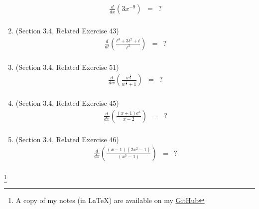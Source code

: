 \documentclass{article}
\newcommand\blfootnote[1]{
    \begingroup
    \renewcommand\thefootnote{}\footnote{#1}
    \addtocounter{footnote}{-1}
    \endgroup
}
\begin{document}
\begin{enumerate}
        \begin{eqnarray}
            \frac{d}{dx}\left(3x^{-9}\right) &=& ? \\
        \end{eqnarray}
    \item (Section 3.4, Related Exercise 43)
        \begin{eqnarray}
            \frac{d}{dt}\left(\frac{t^3 + 3t^2 + t}{t^3}\right) &=& ? \\
        \end{eqnarray}
    \item (Section 3.4, Related Exercise 51)
        \begin{eqnarray}
            \frac{d}{dw}\left(\frac{w^{\frac{5}{3}}}{w^{\frac{5}{3}} + 1}\right) &=& ? \\
        \end{eqnarray}
    \item (Section 3.4, Related Exercise 45)
        \begin{eqnarray}
            \frac{d}{dx}\left(\frac{(x + 1)e^x}{x - 2}\right) &=& ? \\
        \end{eqnarray}
    \item (Section 3.4, Related Exercise 46)
        \begin{eqnarray}
            \frac{d}{dx}\left(\frac{(x - 1)(2x^2 - 1)}{(x^3 - 1)}\right) &=& ? \\
        \end{eqnarray}
\end{enumerate}

\blfootnote{A copy of my notes (in \LaTeX) are available on my \href{https://github.com/onlinechronically/MATH-211}{GitHub}}
\end{document}
